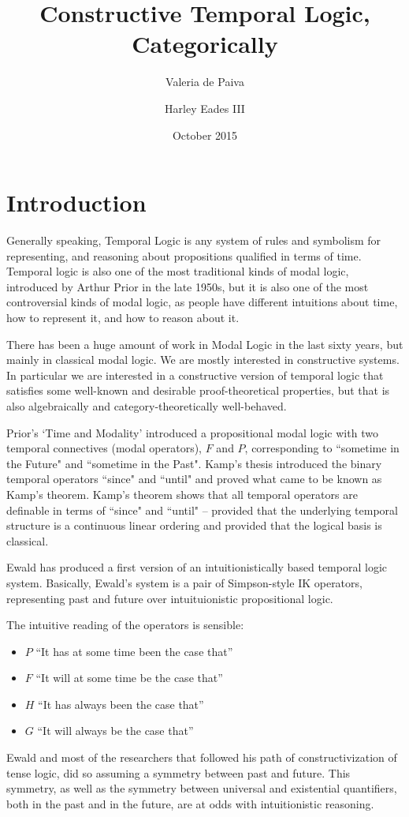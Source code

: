 \documentclass{article}
\title{Constructive Temporal Logic, Categorically}
\author{Valeria de Paiva \and Harley Eades III}
\date{October 2015}
\begin{document}
\maketitle

\section{Introduction}
Generally speaking, Temporal Logic is any system of rules and
symbolism for representing, and reasoning about propositions qualified in terms of time.  Temporal logic is also one of the most traditional kinds of modal logic, introduced by Arthur Prior in the late 1950s,
but it is also one of the most controversial kinds of modal logic, as people have different intuitions about time, how to represent it, and  how to reason about it.

There has been a huge amount of work in Modal Logic in the last sixty years, but mainly in classical modal logic. We are mostly interested in constructive systems. In particular we are interested in a constructive version of temporal logic that satisfies some well-known and desirable proof-theoretical properties, but that is also algebraically and category-theoretically well-behaved.

Prior's `Time and Modality' introduced a propositional modal logic with two temporal connectives (modal operators), $F$ and $P$, corresponding to ``sometime in the {F}uture" and ``sometime in the {P}ast". Kamp's thesis introduced the binary temporal operators ``since" and ``until" and proved what came to be known as Kamp's theorem. Kamp's theorem shows that all temporal operators are definable in terms of ``since" and ``until" -- provided that the underlying temporal structure is a continuous linear ordering and provided that the logical basis is classical.

Ewald \cite{ewald1986} has produced a first version of an intuitionistically based temporal logic system. Basically, Ewald's system is a pair of Simpson-style IK
operators\cite{simpson1994}, representing past and future over
intuituionistic propositional logic.

The intuitive reading of the operators is sensible:
\begin{itemize}
\item $P$ “It has at some time been the case that” 
\item $F$ “It will at some time be the case that” 
\item $H$ “It has always been the case that” 
\item $G$  “It will always be the case that” 
\end{itemize}
Ewald and most of the researchers that followed his path of
constructivization of tense logic, did so assuming a symmetry between past and future. This symmetry, as well as the symmetry between universal and existential
quantifiers, both in the past and in the future, are at odds with
intuitionistic reasoning.
\end{document}
